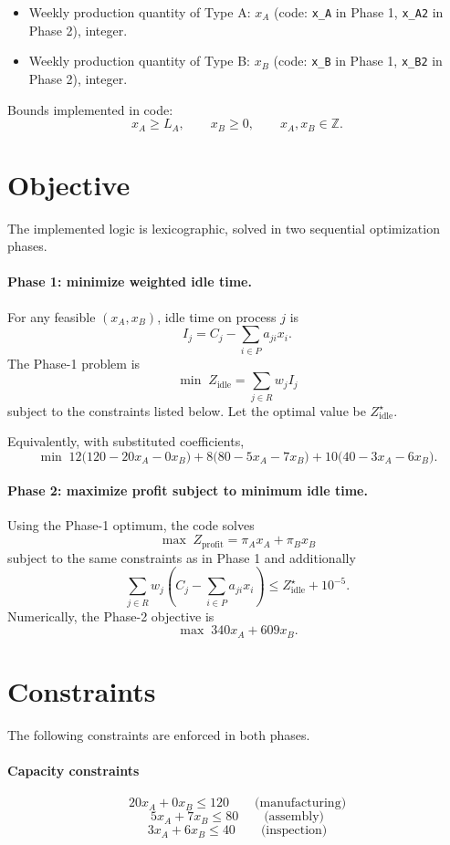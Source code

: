 \begin{itemize}
    \item Weekly production quantity of Type A: \(x_A\) (code: \texttt{x\_A} in Phase 1, \texttt{x\_A2} in Phase 2), integer.
    \item Weekly production quantity of Type B: \(x_B\) (code: \texttt{x\_B} in Phase 1, \texttt{x\_B2} in Phase 2), integer.
\end{itemize}

Bounds implemented in code:
\[
x_A \ge L_A,\qquad x_B \ge 0,\qquad x_A,x_B \in \mathbb{Z}.
\]

\section*{Objective}

The implemented logic is lexicographic, solved in two sequential optimization phases.

\paragraph{Phase 1: minimize weighted idle time.}
For any feasible \((x_A,x_B)\), idle time on process \(j\) is
\[
I_j = C_j - \sum_{i\in P} a_{ji}x_i.
\]
The Phase-1 problem is
\[
\min \; Z_{\mathrm{idle}}=\sum_{j\in R} w_j I_j
\]
subject to the constraints listed below. Let the optimal value be \(Z_{\mathrm{idle}}^\star\).

Equivalently, with substituted coefficients,
\[
\min \; 12\bigl(120-20x_A-0x_B\bigr)+8\bigl(80-5x_A-7x_B\bigr)+10\bigl(40-3x_A-6x_B\bigr).
\]

\paragraph{Phase 2: maximize profit subject to minimum idle time.}
Using the Phase-1 optimum, the code solves
\[
\max \; Z_{\mathrm{profit}}=\pi_A x_A+\pi_B x_B
\]
subject to the same constraints as in Phase 1 and additionally
\[
\sum_{j\in R} w_j\left(C_j-\sum_{i\in P} a_{ji}x_i\right)\le Z_{\mathrm{idle}}^\star + 10^{-5}.
\]
Numerically, the Phase-2 objective is
\[
\max \; 340x_A+609x_B.
\]

\section*{Constraints}

The following constraints are enforced in both phases.

\paragraph{Capacity constraints}
\[
20x_A+0x_B \le 120 \qquad \text{(manufacturing)}
\]
\[
5x_A+7x_B \le 80 \qquad \text{(assembly)}
\]
\[
3x_A+6x_B \le 40 \qquad \text{(inspection)}
\]

